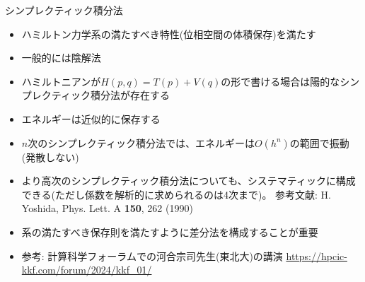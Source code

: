 \begin{frame}[t,fragile]{シンプレクティック積分法}
  \begin{itemize}
  \item ハミルトン力学系の満たすべき特性(位相空間の体積保存)を満たす
  \item 一般的には陰解法
  \item ハミルトニアンが$H(p,q) = T(p) + V(q)$の形で書ける場合は陽的なシンプレクティック積分法が存在する
  \item エネルギーは近似的に保存する
  \item $n$次のシンプレクティック積分法では、エネルギーは$O(h^n)$の範囲で振動(発散しない)
  \item より高次のシンプレクティック積分法についても、システマティックに構成できる(ただし係数を解析的に求められるのは4次まで)。
    参考文献: H. Yoshida, Phys. Lett. A {\bf 150}, 262 (1990)
  \end{itemize}
  \begin{itemize}
    \item 系の満たすべき保存則を満たすように差分法を構成することが重要
    \item 参考: 計算科学フォーラムでの河合宗司先生(東北大)の講演 \url{https://hpcic-kkf.com/forum/2024/kkf_01/}
  \end{itemize}
\end{frame}
